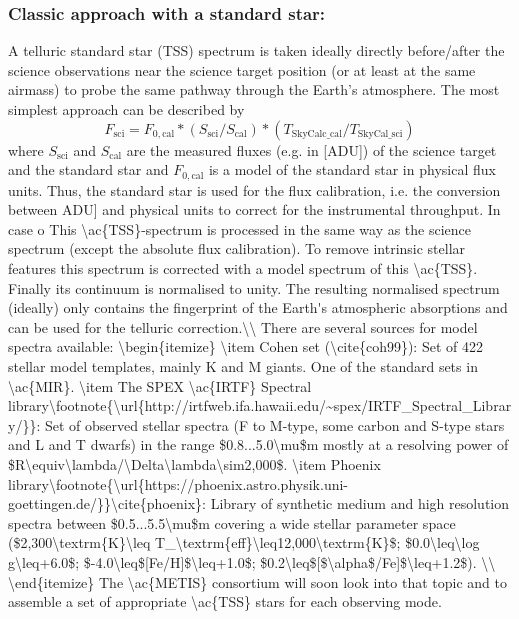 \subsubsection{Classic approach with a standard star:}\label{sssec:tecllcorrclassic}
A telluric standard star (\ac{TSS}) spectrum is taken ideally directly before/after the science observations near the science target position (or at least at the same airmass) to probe the same pathway through the Earth's atmosphere. The most simplest approach can be described by
\begin{equation}
    F_\textrm{sci}=F_{0,\textrm{cal}}*\left(S_\textrm{sci}/S_\textrm{cal}\right)*\left(T_\textrm{SkyCalc_cal} / T_\textrm{SkyCal_sci}\right)
\end{equation}
where $S_\textrm{sci}$ and $S_\textrm{cal}$ are the measured fluxes (e.g. in [\ac{ADU}]) of the science target and the standard star and $F_{0,\textrm{cal}}$ is a model of the standard star in physical flux units. Thus, the standard star is used for the flux calibration, i.e. the conversion between \ac{ADU] and physical units to correct for the instrumental throughput. In case o

This \ac{TSS}-spectrum is processed in the same way as the science spectrum (except the absolute flux calibration). To remove intrinsic stellar features this spectrum is corrected with a model spectrum of this \ac{TSS}. Finally its continuum is normalised to unity. The resulting normalised spectrum (ideally) only contains the fingerprint of the Earth's atmospheric absorptions and can be used for the telluric correction.\\
There are several sources for model spectra available:
\begin{itemize}
    \item Cohen set (\cite{coh99}): Set of 422 stellar model templates, mainly K and M giants. One of the standard sets in \ac{MIR}.
    \item The SPEX \ac{IRTF} Spectral library\footnote{\url{http://irtfweb.ifa.hawaii.edu/~spex/IRTF_Spectral_Library/}}: Set of observed stellar spectra (F to M-type, some carbon and S-type stars and L and T dwarfs) in the range $0.8...5.0\mu$m mostly at a resolving power of $R\equiv\lambda/\Delta\lambda\sim2,000$.
    \item Phoenix library\footnote{\url{https://phoenix.astro.physik.uni-goettingen.de/}}\cite{phoenix}: Library of synthetic medium and high resolution spectra between $0.5...5.5\mu$m covering a wide stellar parameter space ($2,300\textrm{K}\leq T_\textrm{eff}\leq12,000\textrm{K}$; $0.0\leq\log g\leq+6.0$; $-4.0\leq$[Fe/H]$\leq+1.0$; $0.2\leq$[$\alpha$/Fe]$\leq+1.2$). \\
\end{itemize}
The \ac{METIS} consortium will soon look into that topic and to assemble a set of appropriate \ac{TSS} stars for each observing mode.

}
